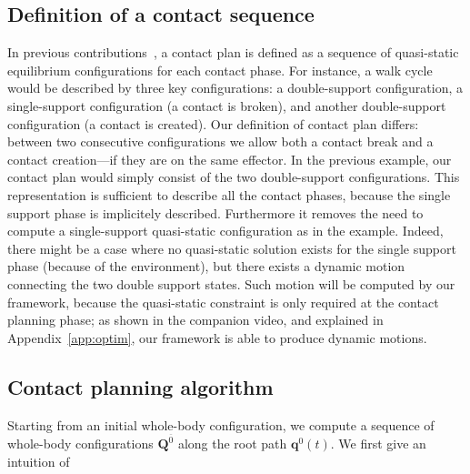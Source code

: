 \documentclass[journal]{IEEEtran}
\providecommand{\DIFaddtex}[1]{#1} %
\providecommand{\DIFdeltex}[1]{} %
\providecommand{\DIFaddbegin}{\protect\color{blue}} %
\providecommand{\DIFaddend}{\protect\color{black}} %
\providecommand{\DIFdelbegin}{\protect\cbdelete} %
\providecommand{\DIFdelend}{} %
\providecommand{\DIFadd}[1]{\texorpdfstring{\DIFaddtex{#1}}{#1}} %
\providecommand{\DIFdel}[1]{\texorpdfstring{\DIFdeltex{#1}}{}} %
\begin{document}
\subsection{Definition of a contact sequence}
In previous contributions~\citep{DBLP:conf/iser/EscandeKMG08}, a contact plan is defined as a sequence of quasi-static equilibrium configurations
for each contact phase. For instance, a walk cycle would be described by three key configurations: a double-support configuration, a single-support configuration (a contact is broken), and another double-support configuration (a contact is created). 
Our definition of contact plan differs: between two consecutive configurations we allow both a contact break and a contact creation---if they are on the same effector. 
In the previous example, our contact plan would simply consist of the two double-support configurations. 
This representation is sufficient to describe all the contact phases\DIFaddbegin \DIFadd{, because the single support phase is implicitely described}\DIFaddend . Furthermore it removes the need to \DIFdelbegin \DIFdel{have }\DIFdelend \DIFaddbegin \DIFadd{compute a }\DIFaddend single-support quasi-static \DIFdelbegin \DIFdel{configurations }\DIFdelend \DIFaddbegin \DIFadd{configuration }\DIFaddend as in the example. \DIFdelbegin \DIFdel{As }\DIFdelend \DIFaddbegin \DIFadd{Indeed, there might be a case where no quasi-static solution exists for the single support phase (because of the environment), but
there exists a dynamic motion connecting the two double support states. Such motion will be computed by our framework, because the quasi-static constraint is only required at the contact planning phase; as }\DIFaddend shown in the companion video, \DIFdelbegin \DIFdel{this allows our framework }\DIFdelend \DIFaddbegin \DIFadd{and explained in Appendix~\ref{app:optim}, our framework is able }\DIFaddend to produce dynamic motions.

\subsection{Contact planning algorithm}
Starting from an initial whole-body configuration, we compute a sequence
of whole-body configurations  $\mathbf{Q}^{\overline{0}}$ along the root path $\mathbf{q}^0(t)$.
\DIFdelbegin \DIFdel{The algorithm can be found in Appendix~\ref{app:contact}. Here we provide }\DIFdelend \DIFaddbegin \DIFadd{We first give }\DIFaddend an intuition of \DIFdelbegin \DIFdel{it.
}%
\end{document}
